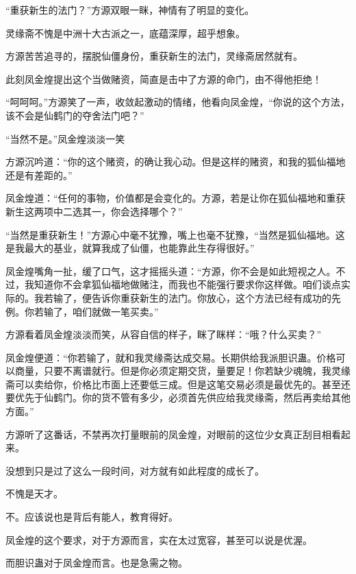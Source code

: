 
\begin{this_body}



“重获新生的法门？”方源双眼一眯，神情有了明显的变化。

灵缘斋不愧是中洲十大古派之一，底蕴深厚，超乎想象。

方源苦苦追寻的，摆脱仙僵身份，重获新生的法门，灵缘斋居然就有。

此刻凤金煌提出这个当做赌资，简直是击中了方源的命门，由不得他拒绝！

“呵呵呵。”方源笑了一声，收敛起激动的情绪，他看向凤金煌，“你说的这个方法，该不会是仙鹤门的夺舍法门吧？”

“当然不是。”凤金煌淡淡一笑

方源沉吟道：“你的这个赌资，的确让我心动。但是这样的赌资，和我的狐仙福地还是有差距的。”

凤金煌道：“任何的事物，价值都是会变化的。方源，若是让你在狐仙福地和重获新生这两项中二选其一，你会选择哪个？”

“当然是重获新生！”方源心中毫不犹豫，嘴上也毫不犹豫，“当然是狐仙福地。这是我最大的基业，就算我成了仙僵，也能靠此生存得很好。”

凤金煌嘴角一扯，缓了口气，这才摇摇头道：“方源，你不会是如此短视之人。不过，我知道你不会拿狐仙福地做赌注，而我也不能强行要求你这样做。咱们谈点实际的。我若输了，便告诉你重获新生的法门。你放心，这个方法已经有成功的先例。你若输了，咱们就做一笔买卖。”

方源看着凤金煌淡淡而笑，从容自信的样子，眯了眯样：“哦？什么买卖？”

凤金煌便道：“你若输了，就和我灵缘斋达成交易。长期供给我派胆识蛊。价格可以商量，只要不离谱就行。但是你必须定期交货，量要足！你若缺少魂魄，我灵缘斋可以卖给你，价格比市面上还要低三成。但是这笔交易必须是最优先的。甚至还要优先于仙鹤门。你的货不管有多少，必须首先供应给我灵缘斋，然后再卖给其他方面。”

方源听了这番话，不禁再次打量眼前的凤金煌，对眼前的这位少女真正刮目相看起来。

没想到只是过了这么一段时间，对方就有如此程度的成长了。

不愧是天才。

不。应该说也是背后有能人，教育得好。

凤金煌的这个要求，对于方源而言，实在太过宽容，甚至可以说是优渥。

而胆识蛊对于凤金煌而言。也是急需之物。


\end{this_body}
